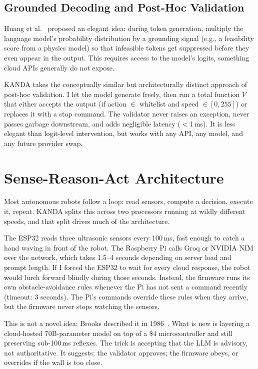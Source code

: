 \subsection{Grounded Decoding and Post-Hoc Validation}
\label{subsec:grounded}

Huang et al.~\cite{huang2023grounded} proposed an elegant idea: during token generation, multiply the language model's probability distribution by a grounding signal (e.g., a feasibility score from a physics model) so that infeasible tokens get suppressed before they even appear in the output. This requires access to the model's logits, something cloud APIs generally do not expose.

KANDA takes the conceptually similar but architecturally distinct approach of post-hoc validation. I let the model generate freely, then run a total function $V$ that either accepts the output (if action $\in$ whitelist and speed $\in [0,255]$) or replaces it with a stop command. The validator never raises an exception, never passes garbage downstream, and adds negligible latency ($<$1\,ms). It is less elegant than logit-level intervention, but works with any API, any model, and any future provider swap.


\section{Sense-Reason-Act Architecture}
\label{sec:sra}

Most autonomous robots follow a loop: read sensors, compute a decision, execute it, repeat. KANDA splits this across two processors running at wildly different speeds, and that split drives much of the architecture.

The ESP32 reads three ultrasonic sensors every 100\,ms, fast enough to catch a hand waving in front of the robot. The Raspberry Pi calls Groq or NVIDIA NIM over the network, which takes 1.5--4 seconds depending on server load and prompt length. If I forced the ESP32 to wait for every cloud response, the robot would lurch forward blindly during those seconds. Instead, the firmware runs its own obstacle-avoidance rules whenever the Pi has not sent a command recently (timeout: 3 seconds). The Pi's commands override these rules when they arrive, but the firmware never stops watching the sensors.


This is not a novel idea; Brooks described it in 1986~\cite{brooks1986robust}. What is new is layering a cloud-hosted 70B-parameter model on top of a \$4 microcontroller and still preserving sub-100\,ms reflexes. The trick is accepting that the LLM is advisory, not authoritative. It suggests; the validator approves; the firmware obeys, or overrides if the wall is too close.

